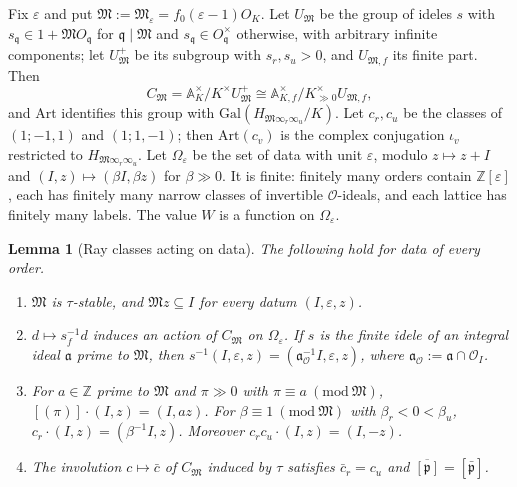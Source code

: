 \documentclass[11pt]{amsart}
\numberwithin{equation}{section}
\theoremstyle{plain}
\newtheorem{lemma}[theorem]{Lemma}
\theoremstyle{definition}
\theoremstyle{remark}
\begin{document}
Fix \(\varepsilon\) and put \(\mathfrak M:=\mathfrak M_\varepsilon=f_0(\varepsilon-1)O_K\). Let \(U_{\mathfrak M}\) be the group of ideles \(s\) with \(s_{\mathfrak q}\in1+\mathfrak MO_{\mathfrak q}\) for \(\mathfrak q\mid\mathfrak M\) and \(s_{\mathfrak q}\in O_{\mathfrak q}^\times\) otherwise, with arbitrary infinite components; let \(U_{\mathfrak M}^+\) be its subgroup with \(s_r,s_u>0\), and \(U_{\mathfrak M,f}\) its finite part. Then
\[C_{\mathfrak M}=\mathbb A_K^\times/K^\times U_{\mathfrak M}^+\cong\mathbb A_{K,f}^\times/K^\times_{\gg0}U_{\mathfrak M,f},\]
and \(\mathrm{Art}\) identifies this group with \(\mathrm{Gal}(H_{\mathfrak M\infty_r\infty_u}/K)\). Let \(c_r,c_u\) be the classes of \((1;-1,1)\) and \((1;1,-1)\); then \(\mathrm{Art}(c_v)\) is the complex conjugation \(\iota_v\) restricted to \(H_{\mathfrak M\infty_r\infty_u}\). Let \(\Omega_\varepsilon\) be the set of data with unit \(\varepsilon\), modulo \(z\mapsto z+I\) and \((I,z)\mapsto(\beta I,\beta z)\) for \(\beta\gg0\). It is finite: finitely many orders contain \(\mathbb Z[\varepsilon]\), each has finitely many narrow classes of invertible \(\mathcal O\)-ideals, and each lattice has finitely many labels. The value \(W\) is a function on \(\Omega_\varepsilon\).

\begin{lemma}[Ray classes acting on data]\label{lem:rayclass}
The following hold for data of every order.
\begin{enumerate}
\item[(a)] \(\mathfrak M\) is \(\tau\)-stable, and \(\mathfrak Mz\subseteq I\) for every datum \((I,\varepsilon,z)\).
\item[(b)] \(d\mapsto s_f^{-1}d\) induces an action of \(C_{\mathfrak M}\) on \(\Omega_\varepsilon\). If \(s\) is the finite idele of an integral ideal \(\mathfrak a\) prime to \(\mathfrak M\), then \(s^{-1}(I,\varepsilon,z)=(\mathfrak a_{\mathcal O}^{-1}I,\varepsilon,z)\), where \(\mathfrak a_{\mathcal O}:=\mathfrak a\cap\mathcal O_I\).
\item[(c)] For \(a\in\mathbb Z\) prime to \(\mathfrak M\) and \(\pi\gg0\) with \(\pi\equiv a\ (\mathrm{mod}\ \mathfrak M)\), \([(\pi)]\cdot(I,z)=(I,az)\). For \(\beta\equiv1\ (\mathrm{mod}\ \mathfrak M)\) with \(\beta_r<0<\beta_u\), \(c_r\cdot(I,z)=(\beta^{-1}I,z)\). Moreover \(c_rc_u\cdot(I,z)=(I,-z)\).
\item[(d)] The involution \(c\mapsto\bar c\) of \(C_{\mathfrak M}\) induced by \(\tau\) satisfies \(\bar c_r=c_u\) and \(\overline{[\mathfrak p]}=[\bar{\mathfrak p}]\).
\end{enumerate}
\end{lemma}
\end{document}
